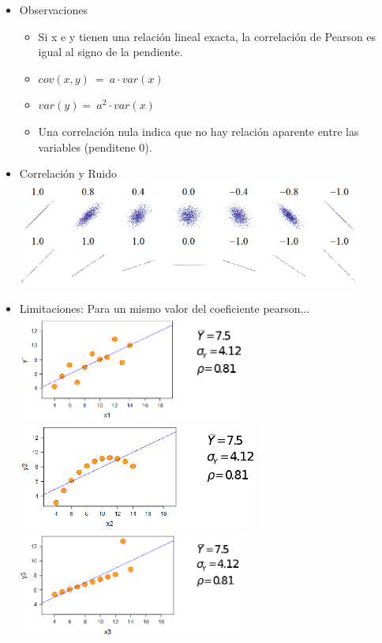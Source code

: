 \begin{itemize}
\begin{itemize}
			\begin{itemize}
				\item Observaciones
				\begin{itemize}
					\item Si x e y tienen una relaci\'on lineal exacta, la correlaci\'on de Pearson es igual al signo de la pendiente.
					\item $cov(x,y)\ =\ a\cdot var(x)$ 
					\item $var(y)=\ a^2\cdot var(x)$ 
					\item Una correlaci\'on nula indica que no hay relaci\'on aparente entre las variables (penditene 0). 
				\end{itemize}
				\item Correlaci\'on y Ruido\\
					\includegraphics[height=3.5cm]{images/ruido}
				\item Limitaciones: Para un mismo valor del coeficiente pearson...\\
					\includegraphics[height=3.5cm]{images/cap4-limit_pearson1.png}\\
					\includegraphics[height=3.5cm]{images/cap4-limit_pearson2.png}\\
					\includegraphics[height=3.5cm]{images/cap4-limit_pearson3.png}\\

\end{itemize}
\end{itemize}
\end{itemize}
